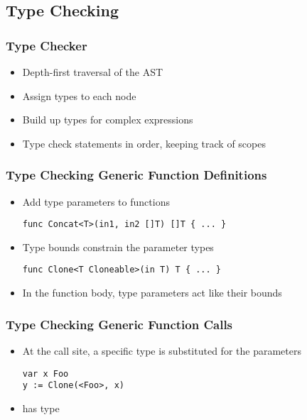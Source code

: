 \documentclass[12pt]{beamer}
\begin{document}

\subsection{Type Checking}

\begin{frame}[fragile]
\frametitle{Type Checker}
\begin{itemize}
\item Depth-first traversal of the AST
\item Assign types to each node
\item Build up types for complex expressions
\item Type check statements in order, keeping track of scopes
\end{itemize}
\end{frame}


\begin{frame}[fragile]
\frametitle{Type Checking Generic Function Definitions}
\begin{itemize}
\item Add type parameters to functions
\begin{verbatim}
func Concat<T>(in1, in2 []T) []T { ... }
\end{verbatim}
\item Type bounds constrain the parameter types
\begin{verbatim}
func Clone<T Cloneable>(in T) T { ... }
\end{verbatim}
\item In the function body, type parameters act like their bounds
\end{itemize}
\end{frame}


\begin{frame}[fragile]
\frametitle{Type Checking Generic Function Calls}
\begin{itemize}
\item At the call site, a specific type is substituted for the parameters
\begin{verbatim}
var x Foo
y := Clone(<Foo>, x)
\end{verbatim}
\item {} has type 
\end{itemize}
\end{frame}
\end{document}
